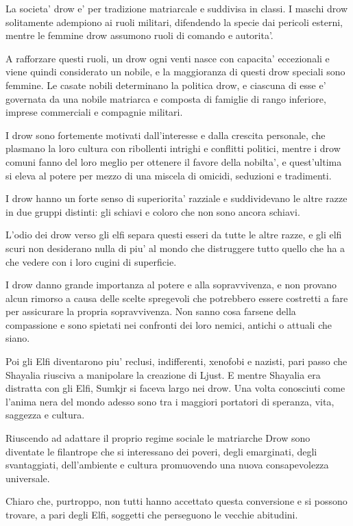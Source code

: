\documentclass[a4paper,11pt,twoside,openany]{book}
\begin{document}
	La societa' drow e' per tradizione matriarcale e suddivisa in classi. I maschi drow solitamente adempiono ai ruoli militari, difendendo la specie dai pericoli esterni, mentre le femmine drow assumono ruoli di comando e autorita'.
	
	A rafforzare questi ruoli, un drow ogni venti nasce con capacita' eccezionali e viene quindi considerato un nobile, e la maggioranza di questi drow speciali sono femmine. Le casate nobili determinano la politica drow, e ciascuna di esse e' governata da una nobile matriarca e composta di famiglie di rango inferiore, imprese commerciali e compagnie militari.
	
	I drow sono fortemente motivati dall'interesse e dalla crescita personale, che plasmano la loro cultura con ribollenti intrighi e conflitti politici, mentre i drow comuni fanno del loro meglio per ottenere il favore della nobilta', e quest'ultima si eleva al potere per mezzo di una miscela di omicidi, seduzioni e tradimenti.
	
	I drow hanno un forte senso di superiorita' razziale e suddividevano le altre razze in due gruppi distinti: gli schiavi e coloro che non sono ancora schiavi.
	
	L'odio dei drow verso gli elfi separa questi esseri da tutte le altre razze, e gli elfi scuri non desiderano nulla di piu' al mondo che distruggere tutto quello che ha a che vedere con i loro cugini di superficie.
	
	I drow danno grande importanza al potere e alla sopravvivenza, e non provano alcun rimorso a causa delle scelte spregevoli che potrebbero essere costretti a fare per assicurare la propria sopravvivenza. Non sanno cosa farsene della compassione e sono spietati nei confronti dei loro nemici, antichi o attuali che siano.
	
	Poi gli Elfi diventarono piu' reclusi, indifferenti, xenofobi e nazisti, pari passo che Shayalia riusciva a manipolare la creazione di Ljust. E mentre Shayalia era distratta con gli Elfi, Sumkjr si faceva largo nei drow. Una volta conosciuti come l'anima nera del mondo adesso sono tra i maggiori portatori di speranza, vita, saggezza e cultura.
	
	Riuscendo ad adattare il proprio regime sociale le matriarche Drow sono diventate le filantrope che si interessano dei poveri, degli emarginati, degli svantaggiati, dell'ambiente e cultura promuovendo una nuova consapevolezza universale.
	
	Chiaro che, purtroppo, non tutti hanno accettato questa conversione e si possono trovare, a pari degli Elfi, soggetti che perseguono le vecchie abitudini.
	
\end{document}
